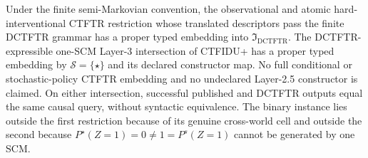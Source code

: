 Under the finite semi-Markovian convention, the observational and atomic hard-interventional CTFTR restriction whose translated descriptors pass the finite DCTFTR grammar has a proper typed embedding into \(\mathfrak I_{\mathrm{DCTFTR}}\).  The DCTFTR-expressible one-SCM Layer-3 intersection of CTFIDU+ has a proper typed embedding by \(\mathcal S=\{\star\}\) and its declared constructor map.  No full conditional or stochastic-policy CTFTR embedding and no undeclared Layer-2.5 constructor is claimed.  On either intersection, successful published and DCTFTR outputs equal the same causal query, without syntactic equivalence.  The binary instance lies outside the first restriction because of its genuine cross-world cell and outside the second because \(P^\star(Z=1)=0\ne1=P^s(Z=1)\) cannot be generated by one SCM.